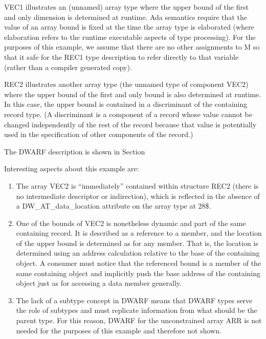 VEC1 illustrates an (unnamed) array type where the upper bound
of the first and only dimension is determined at runtime. Ada
semantics require that the value of an array bound is fixed at
the time the array type is elaborated (where elaboration refers
to the runtime executable aspects of type processing). For
the purposes of this example, we assume that there are no
other assignments to M so that it safe for the REC1 type
description to refer directly to that variable (rather than
a compiler generated copy).

REC2 illustrates another array type (the unnamed type of
component VEC2) where the upper bound of the first and only
bound is also determined at runtime. In this case, the upper
bound is contained in a discriminant of the containing record
type. (A discriminant is a component of a record whose value
cannot be changed independently of the rest of the record
because that value is potentially used in the specification
of other components of the record.)

The DWARF description is shown in 
Section 


Interesting aspects about this example are:

\begin{enumerate}[1)]
\item The array VEC2 is ``immediately'' contained within structure
REC2 (there is no intermediate descriptor or indirection),
which is reflected in the absence of a DW\-\_AT\-\_data\-\_location
attribute on the array type at 28\$.

\item One of the bounds of VEC2 is nonetheless dynamic and part of
the same containing record. It is described as a reference to
a member, and the location of the upper bound is determined
as for any member. That is, the location is determined using
an address calculation relative to the base of the containing
object.  A consumer must notice that the referenced bound is a
member of the same containing object and implicitly push the
base address of the containing object just as for accessing
a data member generally.

\item The lack of a subtype concept in DWARF means that DWARF types
serve the role of subtypes and must replicate information from
what should be the parent type. For this reason, DWARF for
the unconstrained array ARR is not needed for the purposes
of this example and therefore not shown.
\end{enumerate}

